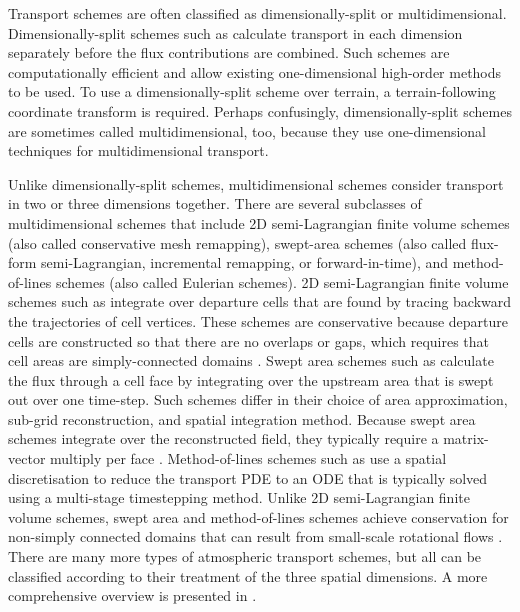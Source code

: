 Transport schemes are often classified as dimensionally-split or multidimensional.
Dimensionally-split schemes such as \citep{lin-rood1996,katta2015} calculate transport in each dimension separately before the flux contributions are combined.  Such schemes are computationally efficient and allow existing one-dimensional high-order methods to be used.  To use a dimensionally-split scheme over terrain, a terrain-following coordinate transform is required.
Perhaps confusingly, dimensionally-split schemes are sometimes called multidimensional, too, because they use one-dimensional techniques for multidimensional transport.

Unlike dimensionally-split schemes, multidimensional schemes consider transport in two or three dimensions together.
There are several subclasses of multidimensional schemes that include
2D semi-Lagrangian finite volume schemes (also called conservative mesh remapping),
swept-area schemes (also called flux-form semi-Lagrangian, incremental remapping, or forward-in-time),
and method-of-lines schemes (also called Eulerian schemes).
2D semi-Lagrangian finite volume schemes such as \citep{iske-kaeser2004,lauritzen2010} integrate over departure cells that are found by tracing backward the trajectories of cell vertices.  These schemes are conservative because departure cells are constructed so that there are no overlaps or gaps, which requires that cell areas are simply-connected domains \citep{lauritzen2011book}.
Swept area schemes such as \citep{lashley2002,skamarock-menchaca2010,lauritzen2011,thuburn2014} calculate the flux through a cell face by integrating over the upstream area that is swept out over one time-step.  Such schemes differ in their choice of area approximation, sub-grid reconstruction, and spatial integration method.
Because swept area schemes integrate over the reconstructed field, they typically require a matrix-vector multiply per face \citep{thuburn2014,skamarock-menchaca2010}.
Method-of-lines schemes such as \citep{weller2009,skamarock-gassmann2011} use a spatial discretisation to reduce the transport PDE to an ODE that is typically solved using a multi-stage timestepping method.  
Unlike 2D semi-Lagrangian finite volume schemes, swept area and method-of-lines schemes achieve conservation for non-simply connected domains that can result from small-scale rotational flows \citep{lauritzen2011}.
There are many more types of atmospheric transport schemes, but all can be classified according to their treatment of the three spatial dimensions.  A more comprehensive overview is presented in \cite{lauritzen2014}.

